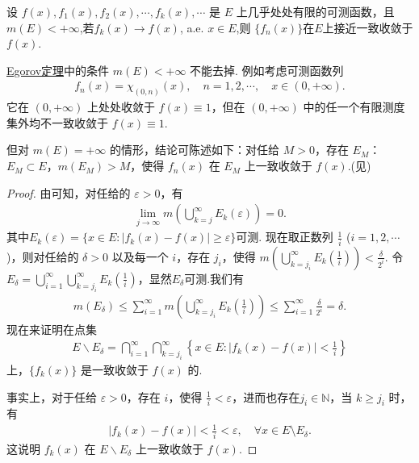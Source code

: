 \documentclass[../../main.tex]{subfiles}%
\begin{document}
\begin{theorem}\label{theorem:Egorov定理}
设 $f(x),f_1(x),f_2(x),\cdots,f_k(x),\cdots$ 是 $E$ 上几乎处处有限的可测函数，且 $m(E)<+\infty$,若$f_k(x)\to f(x)$, a.e. $x\in E$,则
$\{f_n(x)\}$在$E$上接近一致收敛于$f(x)$.
\end{theorem}
\begin{remark}
\hyperref[theorem:Egorov定理]{Egorov定理}中的条件 $m(E)<+\infty$ 不能去掉. 例如考虑可测函数列
\begin{align*}
f_n(x)=\chi_{(0,n)}(x),\quad n = 1,2,\cdots,\quad x\in(0,+\infty).
\end{align*}
它在 $(0,+\infty)$ 上处处收敛于 $f(x)\equiv1$，但在 $(0,+\infty)$ 中的任一个有限测度集外均不一致收敛于 $f(x)\equiv1$.

但对 $m(E)=+\infty$ 的情形，结论可陈述如下：对任给 $M>0$，存在 $E_M$：$E_M\subset E$，$m(E_M)>M$，使得 $f_n(x)$ 在 $E_M$ 上一致收敛于 $f(x)$.(见)
\end{remark}
\begin{proof}

由可知，对任给的 $\varepsilon>0$，有
\begin{align*}
\lim_{j\to\infty}m\left(\bigcup_{k = j}^{\infty}E_k(\varepsilon)\right)=0.
\end{align*}
其中$E_k(\varepsilon) = \{x \in E: |f_k(x) - f(x)| \geqslant \varepsilon\}$可测.
现在取正数列 $\frac{1}{i}$ ($i = 1,2,\cdots$)，则对任给的 $\delta>0$ 以及每一个 $i$，存在 $j_i$，使得 $m\left(\bigcup_{k = j_i}^{\infty}E_k\left(\frac{1}{i}\right)\right)<\frac{\delta}{2^i}$. 令 $E_\delta=\bigcup_{i = 1}^{\infty}\bigcup_{k = j_i}^{\infty}E_k\left(\frac{1}{i}\right)$，显然$E_\delta$可测.我们有
\begin{align*}
m(E_\delta)\leqslant\sum_{i = 1}^{\infty}m\left(\bigcup_{k = j_i}^{\infty}E_k\left(\frac{1}{i}\right)\right)\leqslant\sum_{i = 1}^{\infty}\frac{\delta}{2^i}=\delta.
\end{align*}
现在来证明在点集
\begin{align*}
E\backslash E_\delta=\bigcap_{i = 1}^{\infty}\bigcap_{k = j_i}^{\infty}\left\{x\in E:\vert f_k(x)-f(x)\vert<\frac{1}{i}\right\}
\end{align*}
上，$\{f_k(x)\}$ 是一致收敛于 $f(x)$ 的.

事实上，对于任给 $\varepsilon>0$，存在 $i$，使得 $\frac{1}{i}<\varepsilon$，进而也存在$j_i\in \mathbb{N}$，当 $k\geqslant j_i$ 时，有
\begin{align*}
\vert f_k(x)-f(x)\vert<\frac{1}{i}<\varepsilon,\quad \forall x\in E\setminus E_\delta.
\end{align*}
这说明 $f_k(x)$ 在 $E\backslash E_\delta$ 上一致收敛于 $f(x)$. 

\end{proof}
\end{document}
